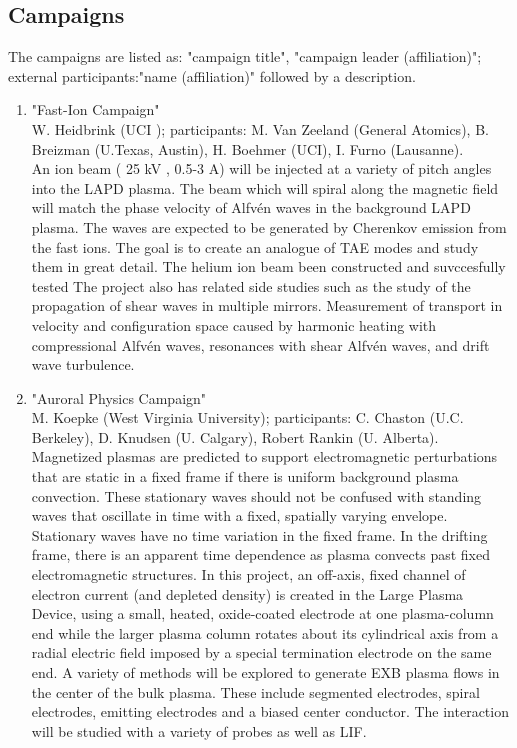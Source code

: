 \documentclass[11pt]{article}
\begin{document}
\subsection{Campaigns}
The campaigns are listed as: "campaign title", "campaign leader (affiliation)"; external participants:"name (affiliation)" followed by a description. 

\begin{enumerate}

\item "Fast-Ion Campaign"\\
W. Heidbrink (UCI ); participants: M. Van Zeeland (General Atomics), B. Breizman (U.Texas, Austin), H. Boehmer (UCI), I. Furno (Lausanne). \\
An ion beam ( 25 kV , 0.5-3 A) will be injected at a variety of pitch angles into the LAPD plasma. The beam which will spiral along the magnetic field will match the phase velocity of Alfv\'{e}n waves in the background LAPD plasma. The waves are expected to be generated by Cherenkov emission from the fast ions. The goal is to create an analogue of TAE modes and study them in great detail. The helium ion beam been constructed and suvccesfully tested The project also has related side studies such as the study of the propagation of shear waves in multiple mirrors. Measurement of transport in velocity and configuration space caused by harmonic heating with compressional Alfv\'{e}n waves, resonances with shear Alfv\'{e}n waves, and drift wave turbulence.

\item "Auroral Physics Campaign" \\
 M. Koepke (West Virginia University); participants: C. Chaston (U.C. Berkeley), D. Knudsen (U. Calgary), Robert Rankin (U. Alberta).\\
 Magnetized plasmas are predicted to support electromagnetic perturbations that are static in a fixed frame if there is uniform background plasma convection. These stationary waves should not be confused with standing waves that oscillate in time with a fixed, spatially varying envelope. Stationary waves have no time variation in the fixed frame. In the drifting frame, there is an apparent time dependence as plasma convects past fixed electromagnetic structures. In this project, an off-axis, fixed channel of electron current (and depleted density) is created in the Large Plasma Device, using a small, heated, oxide-coated electrode at one plasma-column end while the larger plasma column rotates about its cylindrical axis from a radial electric field imposed by a special termination electrode on the same end. A variety of methods will be explored to generate EXB plasma flows in the center of the bulk plasma. These include segmented electrodes, spiral electrodes, emitting electrodes and a biased center conductor. The interaction will be studied with a variety of probes as well as LIF.
 

\end{enumerate}
\end{document}
